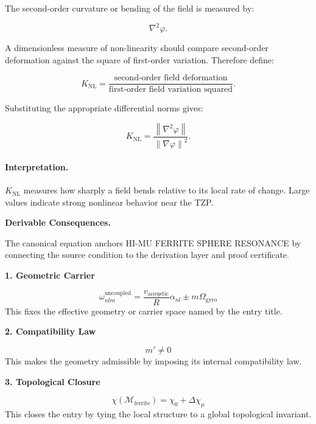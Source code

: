 The second-order curvature or bending of the field is measured by:

\begin{equation}
\nabla^2\varphi .
\end{equation}

A dimensionless measure of non-linearity should compare second-order deformation against the square of first-order variation. Therefore define:

\begin{equation}
K_{\mathrm{NL}}
=
\frac{\text{second-order field deformation}}
{\text{first-order field variation squared}} .
\end{equation}

Substituting the appropriate differential norms gives:

\begin{equation}
\boxed{
K_{\mathrm{NL}}
=
\frac{\left\lVert \nabla^{2}\varphi\right\rVert}
{\left\lVert \nabla\varphi\right\rVert^{2}} .
}
\end{equation}

\paragraph{Interpretation.}
$K_{\mathrm{NL}}$ measures how sharply a field bends relative to its local rate of change. Large values indicate strong nonlinear behavior near the TZP.

\par\vspace{0.35em}
\noindent\textbf{Derivable Consequences.}\quad
\begingroup
\footnotesize
\raggedright
The canonical equation anchors HI-MU FERRITE SPHERE RESONANCE by connecting the source condition to the derivation layer and proof certificate.
\par\endgroup

\noindent\textbf{1. Geometric Carrier}\par
\[
\omega_{nlm}^{\mathrm{uncoupled}}=
\frac{v_{\mathrm{acoustic}}}{R}\alpha_{nl}\pm m\Omega_{\mathrm{gyro}}
\]
\noindent This fixes the effective geometry or carrier space named by the entry title.\par
\noindent\textbf{2. Compatibility Law}\par
\[
m'\neq 0
\]
\noindent This makes the geometry admissible by imposing its internal compatibility law.\par
\noindent\textbf{3. Topological Closure}\par
\[
\chi(\mathcal{M}_{\mathrm{ferrite}})=\chi_0+\Delta\chi_{\mu}
\]
\noindent This closes the entry by tying the local structure to a global topological invariant.\par

